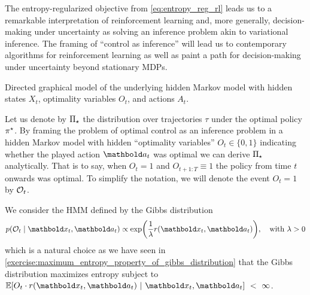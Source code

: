 The entropy-regularized objective from \cref{eq:entropy_reg_rl} leads us to a remarkable interpretation of reinforcement learning and, more generally, decision-making under uncertainty as solving an inference problem akin to variational inference.
The framing of ``control as inference'' will lead us to contemporary algorithms for reinforcement learning as well as paint a path for decision-making under uncertainty beyond stationary MDPs.

\begin{marginfigure}
  \caption{Directed graphical model of the underlying hidden Markov model with hidden states $X_t$, optimality variables $O_t$, and actions $A_t$.}
\end{marginfigure}

Let us denote by $\Pi_\star$ the distribution over trajectories $\tau$ under the optimal policy $\pi^\star$.
By framing the problem of optimal control as an inference problem in a hidden Markov model with hidden ``optimality variables'' $O_t \in \{0, 1\}$ indicating whether the played action $\va_t$ was optimal we can derive $\Pi_\star$ analytically.
That is to say, when $O_t = 1$ and $O_{t+1:T} \equiv 1$ the policy from time $t$ onwards was optimal.
To simplify the notation, we will denote the event $O_t = 1$ by $\mathcal{O}_t$.

We consider the HMM defined by the Gibbs distribution \begin{align}
  p(\spO_t \mid \vx_t, \va_t) \propto \exp\parentheses*{\frac{1}{\lambda} r(\vx_t, \va_t)}, \quad\text{with $\lambda > 0$} \label{eq:merl_optimality}
\end{align} which is a natural choice as we have seen in \cref{exercise:maximum_entropy_property_of_gibbs_distribution} that the Gibbs distribution maximizes entropy subject to $\E{O_t \cdot r(\vx_t, \va_t)}[\vx_t, \va_t]~<~\infty$.

